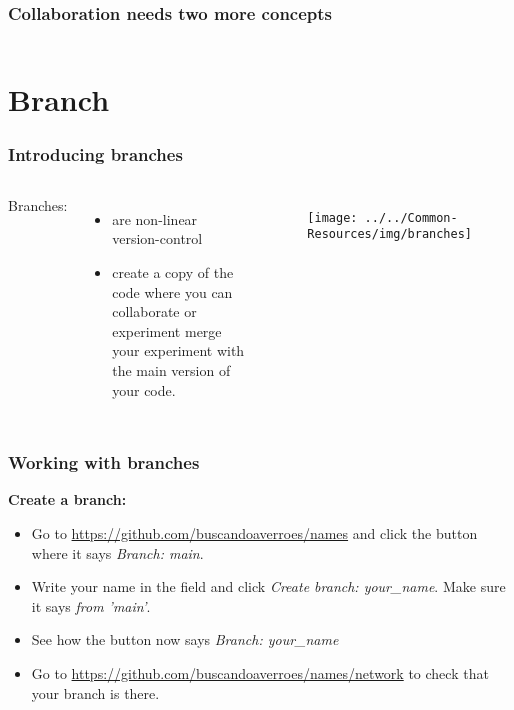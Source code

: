 \documentclass[aspectratio=169]{beamer} %
\newcommand{\trainingURL}[1]{{\color{blue}\url{#1}}}
\newcommand{\traininerUsername}{buscandoaverroes}
\newcommand{\repoName}{\traininerUsername/names}
\newcommand{\trainingRepoURL}[1]{\trainingURL{https://github.com/\repoName #1}}
\begin{document}
\begin{frame}
\frametitle{Collaboration needs two more concepts}


	\vspace{1cm}

	\begin{columns}[c]



	\end{columns}

	\vspace{2cm}

\end{frame}

\section{Branch}

\begin{frame}
\frametitle{Introducing branches}

	\begin{columns}[c]

		\column{.40\textwidth}
		Branches:
		\begin{itemize}
			\item are non-linear version-control
			\item create a copy of the code where you can collaborate or experiment
			 merge your experiment with the main version of your code.
		\end{itemize}

		\column{.40\textwidth}
		\begin{figure}
			\centering
			\texttt{[image: ../../Common-Resources/img/branches]}
			\label{fig:branches}
		\end{figure}

	\end{columns}

\end{frame}

\begin{frame}
\frametitle{Working with branches}


	\textbf{Create a branch:}
	\begin{itemize}
		\item Go to \trainingRepoURL{} and click the button where it says \textit{Branch: main}.
		\item Write your name in the field and click \textit{Create branch: your\_name}. Make sure it says \textit{from 'main'}.
		\item See how the button now says \textit{Branch: your\_name}
		\item Go to \trainingRepoURL{/network} to check that your branch is there.
	\end{itemize}

\end{frame}
\end{document}

